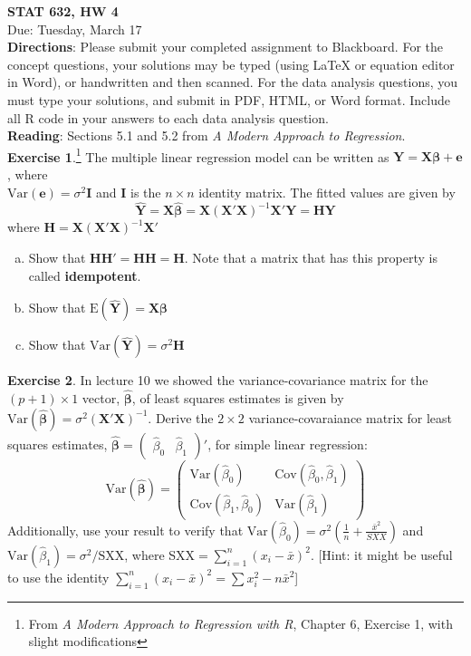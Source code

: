 \documentclass[11pt]{article}\usepackage[]{graphicx}\usepackage[]{color}
\newcommand{\Var}{\textrm{Var}}
\newcommand{\Cov}{\textrm{Cov}}
\newcommand{\E}{\textrm{E}}
\newcommand{\SXX}{\textrm{SXX}}
\begin{document}
\setlength\parindent{0pt}

\textbf{STAT 632, HW 4}\\
Due: Tuesday, March 17\\

\textbf{Directions}:  Please submit your completed assignment to Blackboard.  For the concept questions, your solutions may be typed (using LaTeX or equation editor in Word), or handwritten and then scanned.  For the data analysis questions, you must type your solutions, and submit in PDF, HTML, or Word format.  Include all R code in your answers to each data analysis question.\\

\textbf{Reading}: Sections 5.1 and 5.2 from \emph{A Modern Approach to Regression}.\\

\textbf{Exercise 1}.\footnote{From \emph{A Modern Approach to Regression with R}, Chapter 6, Exercise 1, with slight modifications}  The multiple linear regression model can be written as $\bm{Y} = \bm{X\beta} + \bm{e}$, where\\ $\Var(\bm{e}) = \sigma^2 \bm{I}$ and $\bm{I}$ is the $n \times n$ identity matrix.  The fitted values are given by 
$$\bm{\hat{Y}} = \bm{X \hat{\beta}} = \bm{X(X'X)}^{-1}\bm{X'Y} = \bm{HY}$$
where $\bm{H} = \bm{X(X'X)}^{-1}\bm{X}'$  
\begin{enumerate}[(a)]
\item Show that $\bm{H H'} = \bm{HH} = \bm{H}$.  Note that a matrix that has this property is called \textbf{idempotent}.  
\item Show that $\E(\hat{\bm{Y}}) = \bm{X\beta}$
\item Show that $\Var(\hat{\bm{Y}}) = \sigma^2 \bm{H}$\\
\end{enumerate}

\textbf{Exercise 2}.  In lecture 10 we showed the variance-covariance matrix for the $(p+1) \times 1$ vector, $\bm{\hat{\beta}}$,  of least squares estimates is given by $\Var(\bm{\hat{\beta}}) = \sigma^2 (\bm{X'X})^{-1}$.  Derive the $2 \times 2$ variance-covaraiance matrix for least squares estimates, $\bm{\hat{\beta}} = \begin{pmatrix} \hat{\beta}_0 & \hat{\beta}_1 \end{pmatrix}'$, for simple linear regression:
\[
\Var(\bm{\hat{\beta}}) = 
\begin{pmatrix}
\Var(\hat{\beta}_0) & \Cov(\hat{\beta}_0, \hat{\beta}_1)\\
\Cov(\hat{\beta}_1, \hat{\beta}_0) & \Var(\hat{\beta}_1)
\end{pmatrix}
\]
Additionally, use your result to verify that $\Var(\hat{\beta}_0) = \sigma^2 \left( \frac{1}{n} + \frac{\bar{x}^2}{SXX} \right)$ and $\Var(\hat{\beta}_1) = \sigma^2 / \SXX$, where \SXX$=\sum_{i=1}^n (x_i - \bar{x})^2$. [Hint: it might be useful to use the identity $\sum_{i=1}^n (x_i - \bar{x})^2 = \sum x_i^2 - n \bar{x}^2$]\\
\vspace{11pt}
\end{document}
